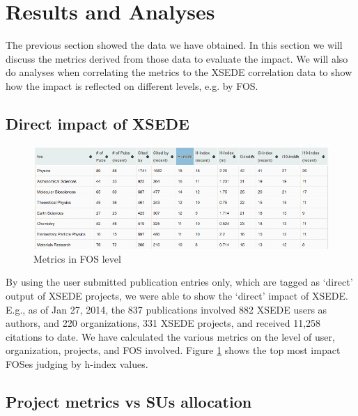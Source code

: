 \section{Results and Analyses}

The previous section showed the data we have obtained. In this section we will discuss the metrics derived from those data to evaluate the impact. We will also do analyses when correlating the metrics to the XSEDE correlation data to show how the impact is reflected on different levels, e.g. by FOS.

\subsection{Direct impact of XSEDE}

\begin{figure}[htb]
  \centering
    \includegraphics[width=1.0\columnwidth]{images/XDPUBS_Metrics_FOS.png}
  \caption{Metrics in FOS level}\label{F:xdpubs-metrics-fos}
\end{figure}

By using the user submitted publication entries only, which are tagged as `direct' output of XSEDE projects, we were able to show the `direct' impact of XSEDE. E.g., as of Jan 27, 2014, the 837 publications involved 882 XSEDE users as authors, and 220 organizations, 331 XSEDE projects, and received 11,258 citations to date. We have calculated the various metrics on the level of user, organization, projects, and FOS involved. Figure \ref{F:xdpubs-metrics-fos} shows the top most impact FOSes judging by h-index values.

\subsection{Project metrics vs SUs allocation}

